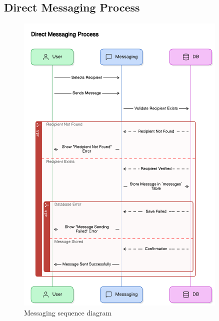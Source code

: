 \subsection{Direct Messaging Process}
\begin{figure}[H]
    \centering
    \includegraphics[width=0.9\textwidth]{images/sequence_diagrams/direct_messaging_process.png}
    \caption{Messaging sequence diagram}
    \label{fig:messaging}
\end{figure}

